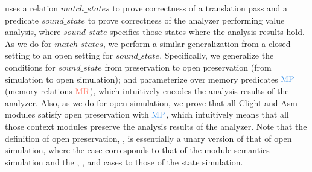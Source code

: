 {\newnewrevisioncmd
\cc{} uses a relation $match\_states$ to prove correctness of a translation pass
and a predicate $sound\_state$ to prove correctness of the analyzer performing value analysis,
where $sound\_state$ specifies those states where the analysis results hold.
As we do for $match\_states$,
we perform a similar generalization from a closed setting to an open setting for $sound\_state$.
Specifically, 
we generalize the conditions for $sound\_state$ from preservation to open preservation
(\cf from simulation to open simulation);
and parameterize over memory predicates $\MPRED{}$ (\cf memory relations $\MREL{}$),
which intuitively encodes the analysis results of the analyzer.
Also, as we do for open simulation,
we prove that all \textrm{Clight} and \textrm{Asm} modules satisfy
open preservation with $\MPRED{}$, which intuitively means that
all those context modules preserve the analysis results of the analyzer.
Note that the definition of open preservation, , is essentially a unary version of
that of open simulation, where the  case corresponds
to that of the module semantics simulation and the ,
, and  cases to those of the state simulation.





}
